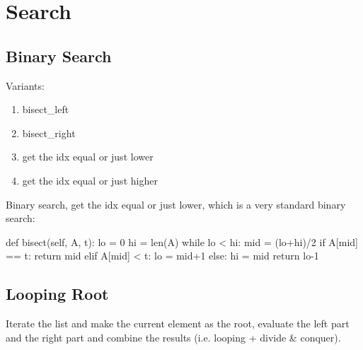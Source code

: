\chapter{Search}

\section{Binary Search}
Variants:
\begin{enumerate}
\item bisect\_left
\item bisect\_right
\item get the idx equal or just lower 
\item get the idx equal or just higher 
\end{enumerate}
Binary search, get the idx equal or just lower, which is a very standard binary search:
\begin{python}
def bisect(self, A, t):
    lo = 0
    hi = len(A)
    while lo < hi:
        mid = (lo+hi)/2
        if A[mid] == t:
            return mid
        elif A[mid] < t:
            lo = mid+1
        else:
            hi = mid
    return lo-1
\end{python}

\section{Looping Root}
Iterate the list and make the current element as the root, evaluate the left part and the right part and combine the results (i.e. looping + divide \& conquer). 
